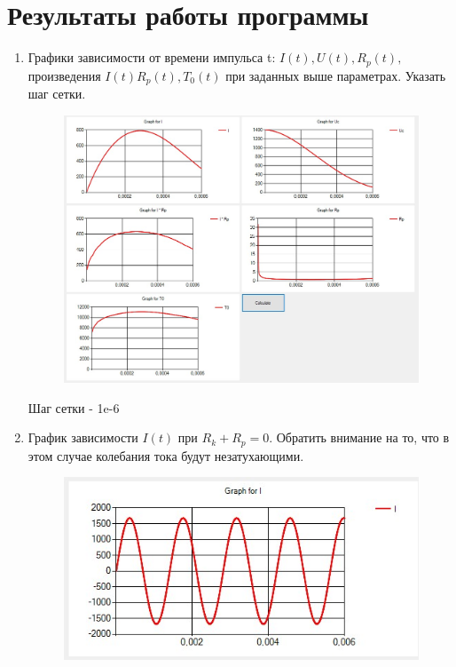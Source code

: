 \documentclass[14pt, a4paper]{extarticle}
\begin{document}
\section*{Результаты работы программы}
\begin{enumerate}
	\item Графики зависимости от времени импульса t: $I(t),U(t),R_p(t),$ произведения $I(t)R_p(t), T_0(t)$ при заданных выше параметрах. Указать шаг сетки.\\
	\begin{figure}[h]
		\centering
		\includegraphics[scale=0.65]{source/test1.jpg}
	\end{figure}\par
	Шаг сетки - 1e-6
	\newpage
	\item График зависимости $I(t)$ при $R_k+R_p=0$. Обратить внимание на то, что в этом случае колебания тока будут незатухающими.\\
	\begin{figure}[h]
		\centering
		\includegraphics[scale=1]{source/test2.jpg}

\end{figure}
\end{enumerate}
\end{document}
